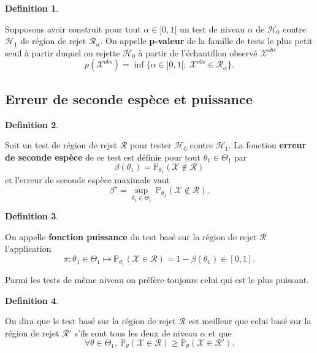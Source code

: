 \documentclass[
]{book}
\theoremstyle{definition}
\newtheorem{definition}{Definition}[chapter]
\theoremstyle{definition}
\theoremstyle{definition}
\theoremstyle{definition}
\theoremstyle{remark}
\begin{document}
\begin{definition}
\protect\hypertarget{def:unlabeled-div-5}{}\label{def:unlabeled-div-5}

Supposons avoir construit pour tout \(\alpha\in]0,1[\) un test de niveau \(\alpha\) de \(\mathcal{H}_0\) contre \(\mathcal{H}_1\) de région de rejet \(\mathcal R_\alpha\).
On appelle \textbf{p-valeur} de la famille de tests le plus petit seuil à partir duquel on rejette \(\mathcal{H}_0\) à partir de l'échantillon observé \(\mathcal{X}^{obs}\)
\[
p(\mathcal{X}^{obs}) = \inf\{\alpha\in]0,1[;\ \mathcal{X}^{obs}\in\mathcal R_\alpha\}.
\]

\end{definition}

\hypertarget{erreur-de-seconde-espuxe8ce-et-puissance}{%
\subsection{Erreur de seconde espèce et puissance}\label{erreur-de-seconde-espuxe8ce-et-puissance}}

\begin{definition}
\protect\hypertarget{def:unlabeled-div-6}{}\label{def:unlabeled-div-6}

Soit un test de région de rejet \(\mathcal R\) pour tester \(\mathcal{H}_0\) contre \(\mathcal{H}_1\).
La fonction \textbf{erreur de seconde espèce} de ce test est définie pour tout \(\theta_1\in\Theta_1\) par
\[
\underline{\beta}(\theta_1) = \mathbb{P}_{\theta_1}(\mathcal{X}\notin \mathcal R)
\]
et l'erreur de seconde espèce maximale vaut
\[
    \beta^\star = \underset{\theta_1\in\Theta_1}{\sup}\ \mathbb{P}_{\theta_1}(\mathcal{X}\notin \mathcal R).
\]

\end{definition}

\begin{definition}
\protect\hypertarget{def:unlabeled-div-7}{}\label{def:unlabeled-div-7}

On appelle \textbf{fonction puissance} du test basé sur la région de rejet \(\mathcal R\) l'application
\[
\pi:\theta_1\in\Theta_1 \mapsto \mathbb{P}_{\theta_1}\left(\mathcal{X}\in \mathcal R\right) = 1 - \beta(\theta_1) \in[0,1].
\]

\end{definition}

Parmi les tests de même niveau on préfère toujours
celui qui est le plus puissant.

\begin{definition}
\protect\hypertarget{def:unlabeled-div-8}{}\label{def:unlabeled-div-8}

On dira que le test basé sur la région de rejet \(\mathcal R\) est meilleur
que celui basé sur la région de rejet \(\mathcal R'\) s'ils sont tous les deux de niveau
\(\alpha\) et que
\[\forall \theta\in \Theta_1, \  \mathbb{P}_{\theta}\left(\mathcal{X}\in \mathcal R\right)\geq \mathbb{P}_{\theta}\left(\mathcal{X}\in \mathcal R'\right).\]

\end{definition}
\end{document}
